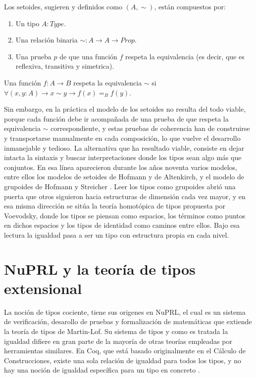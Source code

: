 \newline
\newline
\indent Los setoides, sugieren \cite{nuoli} y \cite{hofmann1995} definidos como $(A, \sim)$, están compuestos por:
  \begin{enumerate}
    \item Un tipo $A : Type$.
    \item Una relación binaria $\sim : A \to A \to Prop$.
    \item Una prueba $p$ de que una función $f$ respeta la equivalencia (es decir, que es reflexiva, transitiva y simetrica).
  \end{enumerate}

  Una función $f : A \to B$ respeta la equivalencia $\sim$ si $\forall(x, y: A) \to x \sim y \to f(x)  =_B f(y)$.
  
Sin embargo, en la práctica el modelo de los setoides no resulta del todo viable, porque cada función debe ir acompañada de una prueba de que respeta la equivalencia $\sim$
correspondiente, y estas pruebas de coherencia han de construirse y transportarse manualmente en cada composición, lo que vuelve el desarrollo inmanejable y tedioso.
\newline
\newline
\indent La alternativa que ha resultado viable, consiste en dejar intacta la sintaxis y buscar interpretaciones donde los tipos sean algo más que conjuntos. En esa línea aparecieron durante los años noventa varios modelos, entre ellos los modelos de setoides de Hofmann y de Altenkirch, y el modelo de grupoides de Hofmann y Streicher \citep{hofmann1995}. Leer los tipos como grupoides abrió una puerta que otros siguieron hacia estructuras de dimensión cada vez mayor, y en esa misma dirección se sitúa la teoría homotópica de tipos propuesta por Voevodsky, donde los tipos se piensan como espacios, los términos como puntos en dichos espacios y los tipos de identidad como caminos entre ellos. Bajo esa lectura la igualdad pasa a ser un tipo con estructura propia en cada nivel.

\section{NuPRL y la teoría de tipos extensional}
La noción de tipos cociente, tiene sus origenes en NuPRL, el cual es un sistema de verificación, desarollo de pruebas y formalización de matemáticas que extiende la teoría de tipos de Martin-Lof. Su sistema de tipos y como es tratada la igualdad difiere en gran parte de la mayoría de otras teorías empleadas por herramientas similares. En Coq, que está basado originalmente en el Cálculo de Construcciones, existe una sola relación de igualdad para todos los tipos, y no hay una noción de igualdad específica para un tipo en concreto \citep{nogin}.

